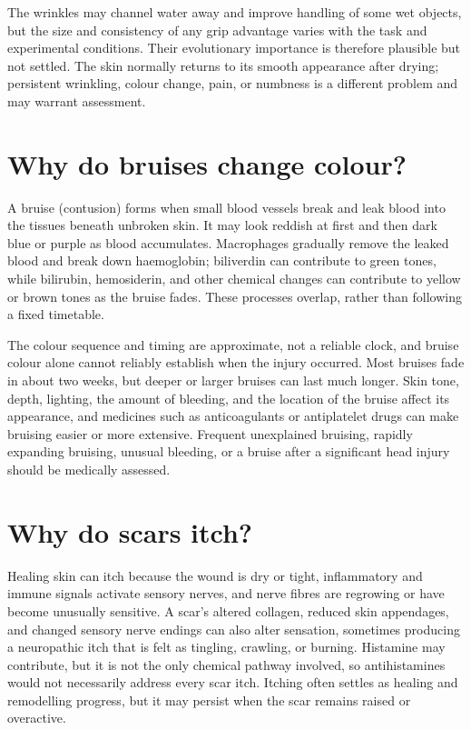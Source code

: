 \documentclass[11pt,oneside]{report}
\begin{document}
The wrinkles may channel water away and improve handling of some wet objects,
but the size and consistency of any grip advantage varies with the task and
experimental conditions. Their evolutionary importance is therefore plausible
but not settled. The skin normally returns to its smooth appearance after
drying; persistent wrinkling, colour change, pain, or numbness is a different
problem and may warrant assessment.

\section{Why do bruises change colour?}

A bruise (contusion) forms when small blood vessels break and leak blood into
the tissues beneath unbroken skin. It may look reddish at first and then dark
blue or purple as blood accumulates. Macrophages gradually remove the leaked
blood and break down haemoglobin; biliverdin can contribute to green tones,
while bilirubin, hemosiderin, and other chemical changes can contribute to
yellow or brown tones as the bruise fades. These processes overlap, rather than
following a fixed timetable.

The colour sequence and timing are approximate, not a reliable clock, and bruise
colour alone cannot reliably establish when the injury occurred. Most bruises
fade in about two weeks, but deeper or larger bruises can last much longer.
Skin tone, depth, lighting, the amount of bleeding, and the location of the
bruise affect its appearance, and medicines such as anticoagulants or
antiplatelet drugs can make bruising easier or more extensive. Frequent
unexplained bruising, rapidly expanding bruising, unusual bleeding, or a bruise
after a significant head injury should be medically assessed.

\section{Why do scars itch?}

Healing skin can itch because the wound is dry or tight, inflammatory and
immune signals activate sensory nerves, and nerve fibres are regrowing or have
become unusually sensitive. A scar's altered collagen, reduced skin appendages,
and changed sensory nerve endings can also alter sensation, sometimes producing
a neuropathic itch that is felt as tingling, crawling, or burning. Histamine may
contribute, but it is not the only chemical pathway involved, so antihistamines
would not necessarily address every scar itch. Itching often settles as healing
and remodelling progress, but it may persist when the scar
remains raised or overactive.
\end{document}
